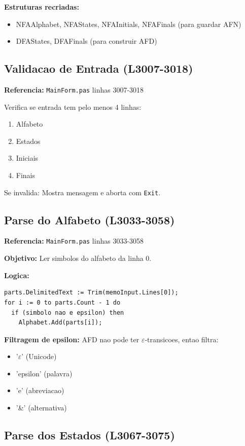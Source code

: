 \documentclass[12pt,a4paper]{article}
\begin{document}
\textbf{Estruturas recriadas:}
\begin{itemize}
    \item NFAAlphabet, NFAStates, NFAInitials, NFAFinals (para guardar AFN)
    \item DFAStates, DFAFinals (para construir AFD)
\end{itemize}

\subsection{Validacao de Entrada (L3007-3018)}

\textbf{Referencia:} \texttt{MainForm.pas} linhas 3007-3018

Verifica se entrada tem pelo menos 4 linhas:
\begin{enumerate}
    \item Alfabeto
    \item Estados
    \item Iniciais
    \item Finais
\end{enumerate}

Se invalida: Mostra mensagem e aborta com \texttt{Exit}.

\subsection{Parse do Alfabeto (L3033-3058)}

\textbf{Referencia:} \texttt{MainForm.pas} linhas 3033-3058

\textbf{Objetivo:} Ler simbolos do alfabeto da linha 0.

\textbf{Logica:}
\begin{lstlisting}[style=pascal]
parts.DelimitedText := Trim(memoInput.Lines[0]);
for i := 0 to parts.Count - 1 do
  if (simbolo nao e epsilon) then
    Alphabet.Add(parts[i]);
\end{lstlisting}

\textbf{Filtragem de epsilon:} AFD nao pode ter $\varepsilon$-transicoes, entao filtra:
\begin{itemize}
    \item '$\varepsilon$' (Unicode)
    \item 'epsilon' (palavra)
    \item 'e' (abreviacao)
    \item '\&' (alternativa)
\end{itemize}

\subsection{Parse dos Estados (L3067-3075)}
\end{document}
